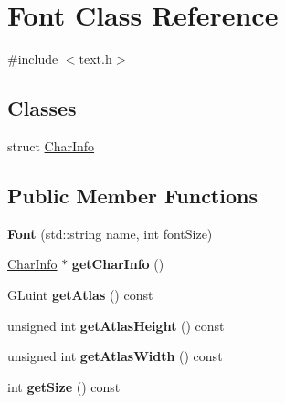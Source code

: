 \hypertarget{class_font}{}\section{Font Class Reference}
\label{class_font}


{\ttfamily \#include $<$text.\+h$>$}

\subsection*{Classes}
\begin{DoxyCompactItemize}
\item 
struct \hyperlink{struct_font_1_1_char_info}{Char\+Info}
\end{DoxyCompactItemize}
\subsection*{Public Member Functions}
\begin{DoxyCompactItemize}
\item 
\hypertarget{class_font_a0fc255ee986a505e9fa67baead2b5ad8}{}{\bfseries Font} (std\+::string name, int font\+Size)\label{class_font_a0fc255ee986a505e9fa67baead2b5ad8}

\item 
\hypertarget{class_font_ad2fa45002c535ee444a00bcaa28d7ab0}{}\hyperlink{struct_font_1_1_char_info}{Char\+Info} $\ast$ {\bfseries get\+Char\+Info} ()\label{class_font_ad2fa45002c535ee444a00bcaa28d7ab0}

\item 
\hypertarget{class_font_a0c776ec8dffad0cbfa512e55e7a69e76}{}G\+Luint {\bfseries get\+Atlas} () const \label{class_font_a0c776ec8dffad0cbfa512e55e7a69e76}

\item 
\hypertarget{class_font_a2a8f74ccaee05c104f26bc52163650fd}{}unsigned int {\bfseries get\+Atlas\+Height} () const \label{class_font_a2a8f74ccaee05c104f26bc52163650fd}

\item 
\hypertarget{class_font_acb8ec4718fca077a312a84410e84a38e}{}unsigned int {\bfseries get\+Atlas\+Width} () const \label{class_font_acb8ec4718fca077a312a84410e84a38e}

\item 
\hypertarget{class_font_a9933e8b7c09d73246f2b572b70ceb2bf}{}int {\bfseries get\+Size} () const \label{class_font_a9933e8b7c09d73246f2b572b70ceb2bf}

\end{DoxyCompactItemize}
